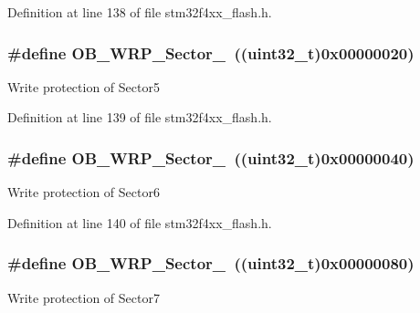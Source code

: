 Definition at line 138 of file stm32f4xx\-\_\-flash.\-h.

\hypertarget{group___option___bytes___write___protection_gae1d6cf3e35d5a75934dec6ce9a5e33c3}{
\subsubsection[{O\-B\-\_\-\-W\-R\-P\-\_\-\-Sector\-\_\-5}]{\setlength{\rightskip}{0pt plus 5cm}\#define O\-B\-\_\-\-W\-R\-P\-\_\-\-Sector\-\_~((uint32\-\_\-t)0x00000020)}}\label{group___option___bytes___write___protection_gae1d6cf3e35d5a75934dec6ce9a5e33c3}
Write protection of Sector5 

Definition at line 139 of file stm32f4xx\-\_\-flash.\-h.

\hypertarget{group___option___bytes___write___protection_ga383d910c0be9c8ec4577b4fd4a6c8954}{
\subsubsection[{O\-B\-\_\-\-W\-R\-P\-\_\-\-Sector\-\_\-6}]{\setlength{\rightskip}{0pt plus 5cm}\#define O\-B\-\_\-\-W\-R\-P\-\_\-\-Sector\-\_~((uint32\-\_\-t)0x00000040)}}\label{group___option___bytes___write___protection_ga383d910c0be9c8ec4577b4fd4a6c8954}
Write protection of Sector6 

Definition at line 140 of file stm32f4xx\-\_\-flash.\-h.

\hypertarget{group___option___bytes___write___protection_ga23f59fa8ec37ea1072e617ac50f09632}{
\subsubsection[{O\-B\-\_\-\-W\-R\-P\-\_\-\-Sector\-\_\-7}]{\setlength{\rightskip}{0pt plus 5cm}\#define O\-B\-\_\-\-W\-R\-P\-\_\-\-Sector\-\_~((uint32\-\_\-t)0x00000080)}}\label{group___option___bytes___write___protection_ga23f59fa8ec37ea1072e617ac50f09632}
Write protection of Sector7 

